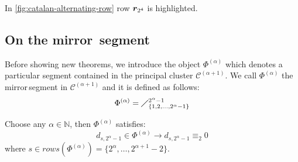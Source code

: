 
In \autoref{fig:catalan-alternating-row} row $\boldsymbol{r}_{2^{4}}$ is highlighted.

\subsection{On the \flqq mirror\frqq\, segment}

Before showing new theorems, we introduce the object
$\Phi^{(\alpha)}$ which denotes a particular segment contained 
in the principal cluster $\mathcal{C}^{(\alpha+1)}$. 
We call $\Phi^{(\alpha)}$ the \flqq mirror\frqq\,segment in 
$\mathcal{C}^{(\alpha+1)}$ and it is defined as follows:
\begin{displaymath}
    \Phi^{(\alpha)}=\diagup_{\lbrace 1,2,\ldots,2^{\alpha}-1\rbrace}^{2^{\alpha}-1}
\end{displaymath}

\begin{theorem}
    Choose any $\alpha\in\mathbb{N}$, then $\Phi^{(\alpha)}$ satisfies: 
    \begin{displaymath}
        d_{s,2^{\alpha}-1}\in\Phi^{(\alpha)} \rightarrow d_{s,2^{\alpha}-1}\equiv_{2}0
    \end{displaymath}
    where $s\in rows\left(\Phi^{(\alpha)}\right)=\lbrace2^{\alpha},\ldots,2^{\alpha+1}-2\rbrace$.
\end{theorem}


